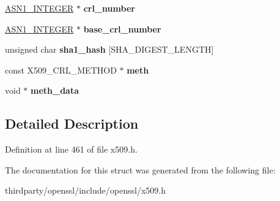 \begin{DoxyCompactItemize}
\item 
\mbox{\label{struct_x509__crl__st_a38d84a6c190dc370d74e145cd4faa8d4}} 
\hyperlink{structasn1__string__st}{A\+S\+N1\+\_\+\+I\+N\+T\+E\+G\+ER} $\ast$ {\bfseries crl\+\_\+number}
\item 
\mbox{\label{struct_x509__crl__st_a758731f9f2c7efcbf2d7e8c6e0b01278}} 
\hyperlink{structasn1__string__st}{A\+S\+N1\+\_\+\+I\+N\+T\+E\+G\+ER} $\ast$ {\bfseries base\+\_\+crl\+\_\+number}
\item 
\mbox{\label{struct_x509__crl__st_a1040792ec929f92137cb677e58cc8e94}} 
unsigned char {\bfseries sha1\+\_\+hash} \mbox{[}S\+H\+A\+\_\+\+D\+I\+G\+E\+S\+T\+\_\+\+L\+E\+N\+G\+TH\mbox{]}
\item 
\mbox{\label{struct_x509__crl__st_a7fbfb8e62320e2a6275153c832c2ccd5}} 
const X509\+\_\+\+C\+R\+L\+\_\+\+M\+E\+T\+H\+OD $\ast$ {\bfseries meth}
\item 
\mbox{\label{struct_x509__crl__st_a409391d6ea1a661d0c27c84e26b9676b}} 
void $\ast$ {\bfseries meth\+\_\+data}
\end{DoxyCompactItemize}


\subsection{Detailed Description}


Definition at line 461 of file x509.\+h.



The documentation for this struct was generated from the following file\+:\begin{DoxyCompactItemize}
\item 
thirdparty/openssl/include/openssl/x509.\+h\end{DoxyCompactItemize}
